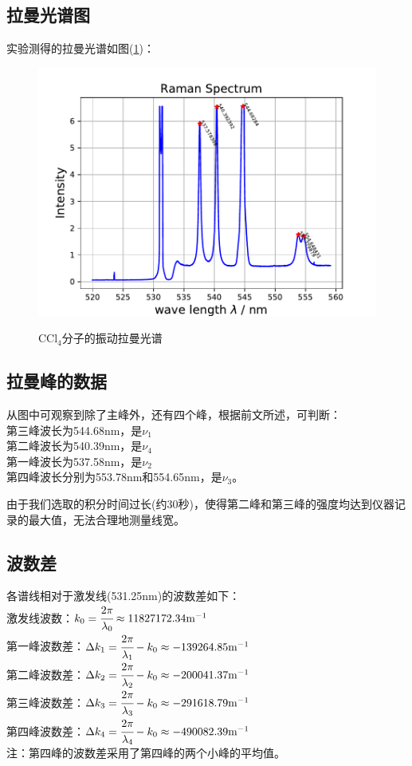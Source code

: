 \documentclass[a4paper]{article}
\begin{document}
\subsection{拉曼光谱图}
实验测得的拉曼光谱如图(\ref{RamanSpecFig})：
\begin{figure}[!h]
\centering
\includegraphics[width=16cm]{fig/RamanSpec.pdf}\\
\caption{$\text{CCl}_4$分子的振动拉曼光谱}\label{RamanSpecFig}
\end{figure}
\subsection{拉曼峰的数据}
从图中可观察到除了主峰外，还有四个峰，根据前文所述，可判断：\\
第三峰波长为544.68nm，是$\nu_1$\\
第二峰波长为540.39nm，是$\nu_4$\\
第一峰波长为537.58nm，是$\nu_2$\\
第四峰波长分别为553.78nm和554.65nm，是$\nu_3$。

由于我们选取的积分时间过长(约30秒)，使得第二峰和第三峰的强度均达到仪器记录的最大值，无法合理地测量线宽。
\subsection{波数差}
各谱线相对于激发线(531.25nm)的波数差如下：\\
激发线波数：$k_0 = \cfrac{2\pi}{\lambda_0} \approx 11827172.34 \text{m}^{-1}$\\
第一峰波数差：$\Delta k_1 = \cfrac{2\pi}{\lambda_1} - k_0 \approx -139264.85 \text{m}^{-1}$\\
第二峰波数差：$\Delta k_2 = \cfrac{2\pi}{\lambda_2} - k_0 \approx -200041.37 \text{m}^{-1}$\\
第三峰波数差：$\Delta k_3 = \cfrac{2\pi}{\lambda_3} - k_0 \approx -291618.79 \text{m}^{-1}$\\
第四峰波数差：$\Delta k_4 = \cfrac{2\pi}{\lambda_4} - k_0 \approx -490082.39 \text{m}^{-1}$\\
注：第四峰的波数差采用了第四峰的两个小峰的平均值。
\end{document}
